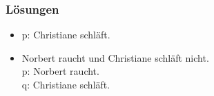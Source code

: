 

\begin{frame}
\frametitle{Lösungen}

\begin{table}

\begin{minipage}{0.3\textwidth}
\centering
\begin{itemize}
\item[] \small{p: Christiane schläft.}
\end{itemize}
\end{minipage}
%	
\begin{minipage}{0.65\textwidth}
\centering
\begin{itemize}
\item[] \small{Norbert raucht und Christiane schläft nicht.\\
               p: Norbert raucht.\\
               q: Christiane schläft.}
\end{itemize}
\end{minipage}

\vspace{1em}


\end{table}
\end{frame}
